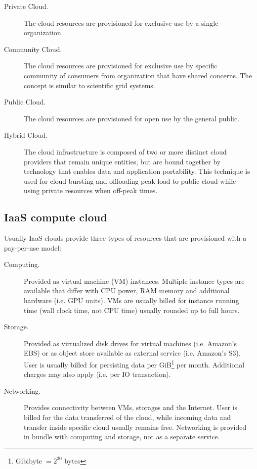 \begin{description}
  \item[Private Cloud.] The cloud resources are provisioned for exclusive use by a single organization.
  \item[Community Cloud.] The cloud resources are provisioned for exclusive use by specific community of consumers from organization that have shared concerns. The concept is similar to scientific grid systems.
  \item[Public Cloud.] The cloud resources are provisioned for open use by the general public.
  \item[Hybrid Cloud.] The cloud infrastructure is composed of two or more distinct cloud providers that remain unique entities, but are bound together by technology that enables data and application portability. This technique is used for cloud bursting and offloading peak load to public cloud while using private resources when off-peak times.
\end{description}

\subsection{IaaS compute cloud}

Usually IaaS clouds provide three types of resources that are provisioned with a pay-per-use model: 
\begin{description}
  \item[Computing.] Provided as virtual machine (VM) instances. Multiple instance types are available that differ with CPU power, RAM memory and additional hardware (i.e. GPU units). VMs are usually billed for instance running time (wall clock time, not CPU time) usually rounded up to full hours.
  \item[Storage.] Provided as virtualized disk drives for virtual machines (i.e. Amazon's EBS) or as object store available as external service (i.e. Amazon's S3). User is usually billed for persisting data per GiB\footnote{Gibibyte $= 2^{30}$ bytes} per month. Additional charges may also apply (i.e. per IO transaction).
  \item[Networking.] Provides connectivity between VMs, storages and the Internet. User is billed for the data transferred of the cloud, while incoming data and transfer inside specific cloud usually remains free. Networking is provided in bundle with computing and storage, not as a separate service.
\end{description}

